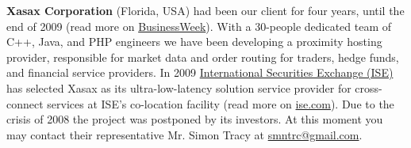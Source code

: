 
\textbf{Xasax Corporation} (Florida, USA)
had been our client for four years, until the end of 2009
(read more on \href{http://investing.businessweek.com/research/stocks/private/snapshot.asp?privcapId=40022267}{BusinessWeek}).
With a 30-people dedicated team of C++, Java, and PHP
engineers we have been developing a proximity hosting provider, responsible for
market data and order routing for traders, hedge funds, and financial service providers.
In 2009 \href{http://www.ise.com}{International Securities Exchange (ISE)} has selected 
Xasax as its ultra-low-latency solution service provider for 
cross-connect services at ISE's co-location facility (read more on 
\href{http://www.ise.com/assets/files/circuits/Circuits_SPRING2009.pdf}{ise.com}).
Due to the crisis of 2008 the project was postponed by its investors.
At this moment you may contact their representative Mr. Simon Tracy at
\href{mailto:smntrc@gmail.com}{smntrc@gmail.com}.